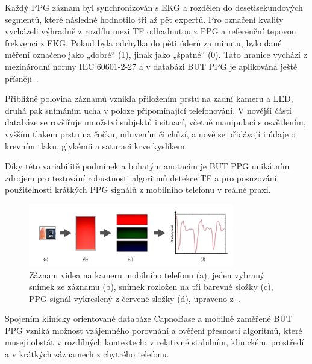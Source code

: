 Každý \acs{PPG} záznam byl synchronizován s \acs{EKG} a rozdělen do desetisekundových segmentů, které následně hodnotilo tři až pět expertů.
Pro označení kvality vycházeli výhradně z rozdílu mezi \acs{TF} odhadnutou z \acs{PPG} a referenční tepovou frekvencí z \acs{EKG}.
Pokud byla odchylka do pěti úderů za minutu, bylo dané měření označeno jako „dobré“ (1), jinak jako „špatné“ (0).
Tato hranice vychází z mezinárodní normy IEC 60601-2-27 a v databázi \acs{BUT PPG} je aplikována ještě přísněji~\cite{BUT_PPG}.

Přibližně polovina záznamů vznikla přiložením prstu na zadní kameru a LED, druhá pak snímáním ucha v poloze připomínající telefonování.
V novější části databáze se rozšiřuje množství subjektů i situací, včetně manipulací s osvětlením, vyšším tlakem prstu na čočku, mluvením či chůzí, a nově se přidávají i údaje o krevním tlaku, glykémii a saturaci krve kyslíkem.

Díky této variabilitě podmínek a bohatým anotacím je \acs{BUT PPG} unikátním zdrojem pro testování robustnosti algoritmů detekce \acs{TF} a pro posuzování použitelnosti krátkých \acs{PPG} signálů z mobilního telefonu v reálné praxi.

\begin{figure}[ht]
	\centering
	\includegraphics[width=0.8\textwidth]{./obrazky/videoZaznamPPG.png}
	\caption[Získání PPG signálu pro databázi \acs{BUT PPG}]{Záznam videa na kameru mobilního telefonu (a), jeden vybraný snímek ze záznamu (b), snímek rozložen na tři barevné složky (c), PPG signál vykreslený z červené složky (d), upraveno z~\cite{Siddiqui2016}.}
	\label{fig:videoZaznamPPG}
\end{figure}

Spojením klinicky orientované databáze CapnoBase a mobilně zaměřené \acs{BUT PPG} vzniká možnost vzájemného porovnání a ověření přesnosti algoritmů, které musejí obstát v rozdílných kontextech: v relativně stabilním, klinickém, prostředí a v krátkých záznamech z chytrého telefonu.